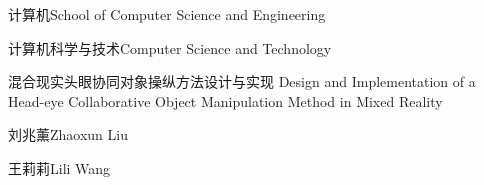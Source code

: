 
\school
{计算机}{School of Computer Science and Engineering}

\major
{计算机科学与技术}{Computer Science and Technology}

\thesistitle
{混合现实头眼协同对象操纵方法设计与实现}
{}
{Design and Implementation of a Head-eye Collaborative Object Manipulation Method in Mixed Reality}
{}

\thesisauthor
{刘兆薰}{Zhaoxun Liu}

\teacher
{王莉莉}{Lili Wang}






